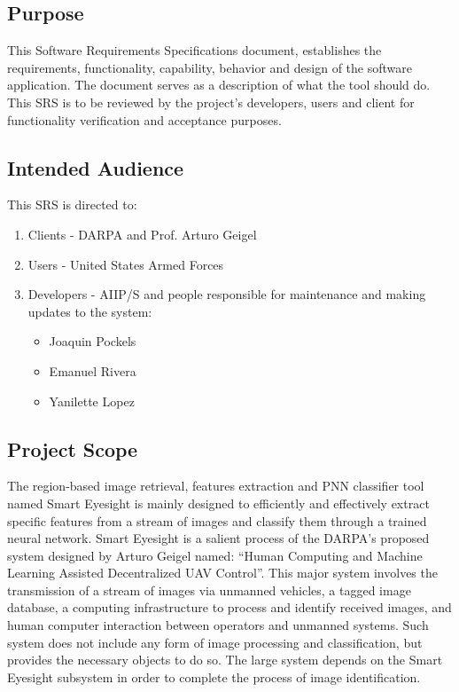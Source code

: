 \documentclass[12pt]{article}
\begin{document}
\subsection{Purpose}
This Software Requirements Specifications document, establishes the
requirements, functionality, capability, behavior and design of the
software application. The document serves as a description of what the
tool should do. This SRS is to be reviewed by the project's
developers, users and client for functionality verification and
acceptance purposes.

\subsection{Intended Audience}
\label{sec:intended_audience}

This SRS is directed to:
\begin{enumerate}
\item Clients - DARPA and Prof. Arturo Geigel
\item Users - United States Armed Forces
\item Developers - AIIP/S and people responsible for maintenance and
  making updates to the system:
  \begin{itemize}
  \item Joaquin Pockels
  \item Emanuel Rivera
  \item Yanilette Lopez
  \end{itemize}
\end{enumerate}

\subsection{Project Scope}
The region-based image retrieval, features extraction and PNN
classifier tool named Smart Eyesight is mainly designed to efficiently
and effectively extract specific features from a stream of images and
classify them through a trained neural network.  Smart Eyesight is a
salient process of the DARPA's proposed system designed by Arturo
Geigel named: ``Human Computing and Machine Learning Assisted
Decentralized UAV Control''. This major system involves the
transmission of a stream of images via unmanned vehicles, a tagged
image database, a computing infrastructure to process and identify
received images, and human computer interaction between operators and
unmanned systems. Such system does not include any form of image
processing and classification, but provides the necessary objects to
do so. The large system depends on the Smart Eyesight subsystem in
order to complete the process of image identification.
\end{document}
